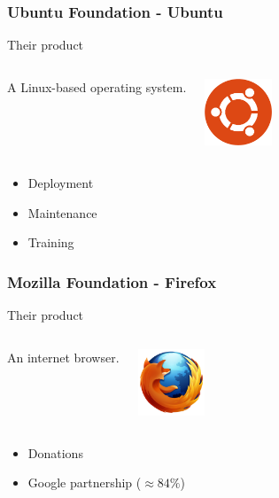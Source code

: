 \documentclass{beamer}
\begin{document}
\begin{frame}

  \frametitle{Ubuntu Foundation - Ubuntu}

  \begin{block}{Their product}
    \begin{columns}[c]

      A Linux-based operating system.

      \includegraphics[width=2cm]{logo_ubuntu.png}

    \end{columns}
  \end{block}

  \vfill

  \begin{itemize}
    \item<2->{Deployment}
    \item<3->{Maintenance}
    \item<4>{Training}
  \end{itemize}

\end{frame}

\begin{frame}

  \frametitle{Mozilla Foundation - Firefox}

  \begin{block}{Their product}
    \begin{columns}[c]

      An internet browser.

      \includegraphics[width=2cm]{logo_firefox.png}

    \end{columns}
  \end{block}

  \vfill

  \begin{itemize}
    \item<2->{Donations}
    \item<3>{Google partnership ($\approx 84\%$)}
  \end{itemize}

\end{frame}
\end{document}
